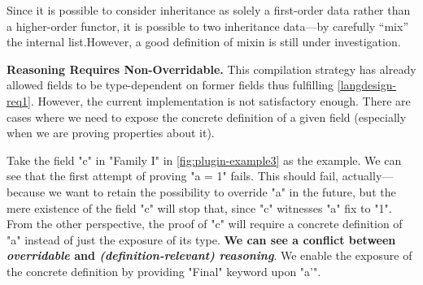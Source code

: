 Since it is possible to consider inheritance as solely a first-order data rather
than a higher-order functor, it is possible to
 two inheritance data---by carefully ``mix'' the internal list.However, a good definition of mixin is still under investigation.





\textbf{Reasoning Requires Non-Overridable.}
This compilation strategy
has already allowed fields to be type-dependent on former fields thus fulfilling
\ref{langdesign-req1}. However, the current implementation is not satisfactory enough. There are cases where we need to expose
the concrete definition of a given field (especially when we are proving
properties about it).

Take the field "c" in "Family I" in \cref{fig:plugin-example3} as the
example. We can see that the first attempt of proving "a = 1" fails.
This should fail, actually---because we want to retain the possibility
to override "a" in the future, but the mere existence of the field "c"
will stop that, since "c" witnesses "a" fix to "1". From the other
perspective, the proof of "c" will require a concrete definition of "a"
instead of just the exposure of its type. \textbf{We can see a conflict
between \textit{overridable} and \textit{(definition-relevant)
reasoning}}.  We enable the exposure of the concrete definition by
providing "Final" keyword upon "a'".

